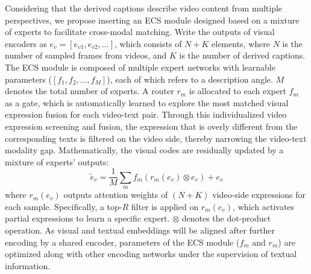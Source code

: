 Considering that the derived captions describe video content from multiple perspectives, we propose inserting an ECS module designed based on a mixture of experts to facilitate cross-modal matching. Write the outputs of visual encoders as $e_v=[e_{v1},e_{v2},...]$, which consists of $N+K$ elements, where $N$ is the number of sampled frames from videos, and $K$ is the number of derived captions. The ECS module is composed of multiple expert networks with learnable parameters ($[f_1, f_2, ...,f_M]$), each of which refers to a description angle. $M$ denotes the total number of experts. A router $r_m$ is allocated to each expert $f_m$ as a gate, which is automatically learned to explore the most matched visual expression fusion for each video-text pair. Through this individualized video expression screening and fusion, the expression that is overly different from the corresponding texts is filtered on the video side, thereby narrowing the video-text modality gap.
Mathematically, the visual codes are residually updated by a mixture of experts' outputs:
\begin{equation}
\tilde{e}_v = \frac{1}{M}\sum_m f_m ( r_m(e_v) \otimes e_v) + e_v
\end{equation}
where $r_m(e_v)$ outputs attention weights of $(N+K)$ video-side expressions for each sample. Specifically, a top-$R$ filter is applied on $r_m(e_v)$, which activates partial expressions to learn a specific expert. $\otimes$ denotes the dot-product operation.  
As visual and textual embeddings will be aligned after further encoding by a shared encoder, parameters of the ECS module ($f_m$ and $r_m$) are optimized along with other encoding networks under the supervision of textual information. 



